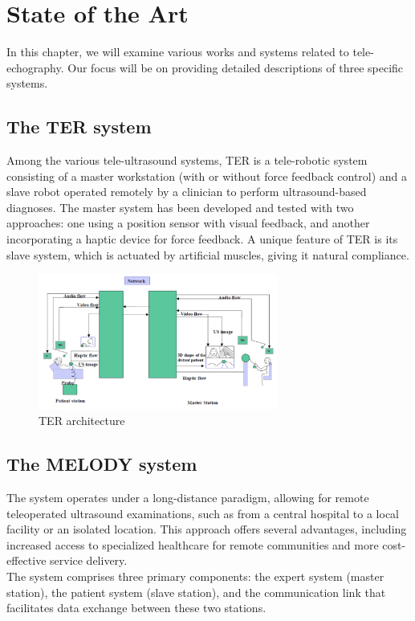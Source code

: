 \documentclass{article}
\begin{document}
\section{State of the Art}
In this chapter, we will examine various works and systems related to tele-echography. Our focus will be on providing detailed descriptions of three specific systems. 

\subsection{The TER system}
Among the various tele-ultrasound systems, TER is a tele-robotic system consisting of a master workstation (with or without force feedback control) and a slave robot operated remotely by a clinician to perform ultrasound-based diagnoses. The master system has been developed and tested with two approaches: one using a position sensor with visual feedback, and another incorporating a haptic device for force feedback. A unique feature of TER is its slave system, which is actuated by artificial muscles, giving it natural compliance.

\begin{figure}[h]
    \centering
    \includegraphics[width=0.7\textwidth]{TER.png}  
    \caption{TER architecture}
    \label{fig:ter}
\end{figure}


\subsection{The MELODY system}
The system operates under a long-distance paradigm, allowing for remote teleoperated ultrasound examinations, such as from a central hospital to a local facility or an isolated location. This approach offers several advantages, including increased access to specialized healthcare for remote communities and more cost-effective service delivery.
\\The system comprises three primary components: the expert system (master station), the patient system (slave station), and the communication link that facilitates data exchange between these two stations.
\end{document}
